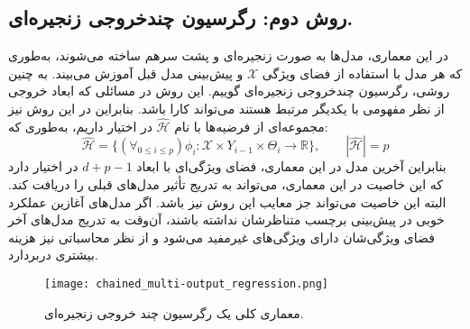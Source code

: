 \begin{redtext}
		\subsection*{روش دوم: رگرسیون چندخروجی زنجیره‌ای.}
		در این معماری، مدل‌ها به صورت زنجیره‌ای و پشت سرهم ساخته می‌شوند، به‌طوری که هر مدل با استفاده از فضای ویژگی $\mathcal{X}$ و پیش‌بینی مدل قبل آموزش می‌بیند. به چنین روشی، رگرسیون چندخروجی زنجیره‌ای گوییم. این روش در مسائلی که ابعاد خروجی از نظر مفهومی با یکدیگر مرتبط هستند می‌تواند کارا باشد. بنابراین در این روش نیز مجموعه‌ای از فرضیه‌ها با نام $\mathcal{\hat{H}}$ در اختیار داریم، به‌طوری که:
		\begin{equation*}
			\mathcal{\hat{H}} = \big\{ (\forall_{0 \leq i \leq p}) \phi_i: \mathcal{X} \times Y_{i-1}\times \Theta_i \rightarrow \mathbb{R} \big\}, \quad\quad | \mathcal{\hat{H}} | = p
		\end{equation*}
		بنابراین آخرین مدل در این معماری، فضای ویژگی‌ای با ابعاد $d + p - 1$ در اختیار دارد که این خاصیت در این معماری، می‌تواند به تدریج تأثیر مدل‌های قبلی را دریافت کند. البته این خاصیت می‌تواند جز معایب این روش نیز باشد. اگر مدل‌های آغازین عملکرد خوبی در پیش‌بینی برچسب متناظرشان نداشته باشند، آن‌وقت به تدریج مدل‌های آخر فضای ویژگی‌شان دارای ویژگی‌های غیرمفید می‌شود و از نظر محاسباتی نیز هزینه بیشتری دربردارد.
		
		\begin{figure}[h]
			\centering
			\texttt{[image: chained\_multi-output\_regression.png]}
			\caption{معماری کلی یک رگرسیون چند خروجی زنجیره‌ای.}
			\label{fig3}
		\end{figure}		
		
	\end{redtext}


